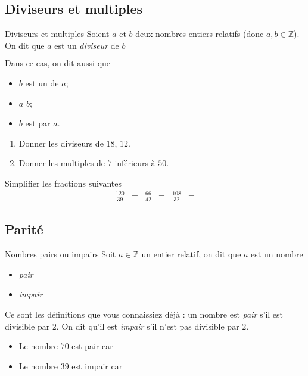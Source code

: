 \documentclass[11pt]{article}
\begin{document}
\subsection{Diviseurs et multiples}
\begin{defi}{Diviseurs et multiples}
  Soient $a$ et $b$ deux nombres entiers relatifs (donc $a,b\in\mathbb{Z}$). On
  dit que $a$ est un \emph{diviseur} de $b$ 
  \[
    \phantom{b = k\times a.}
  \]
  Dans ce cas, on dit aussi que
  \begin{itemize}
    \item $b$ est un \hspace{2cm} de $a$;
    \item $a$ \hspace{2cm} $b$;
    \item $b$ est \hspace{2cm} par $a$.
  \end{itemize}
\end{defi}
\begin{exemple}
  \begin{enumerate}
    \item Donner les diviseurs de $18$, $12$.
    \item Donner les multiples de $7$ inférieurs à $50$.
  \end{enumerate}
\end{exemple}
\begin{exemple}
  Simplifier les fractions suivantes
  \begin{align*}
    \frac{120}{39} &= &
    \frac{66}{42} &= &
    \frac{108}{32} &=
  \end{align*}
\end{exemple}
\subsection{Parité}
\begin{defi}{Nombres pairs ou impairs}
  Soit $a\in\mathbb{Z}$ un entier relatif, on dit que $a$ est un nombre
  \begin{itemize}
    \item \emph{pair} 
    \item \emph{impair} 
  \end{itemize}
\end{defi}
\begin{rmq}
  Ce sont les définitions que vous connaissiez déjà : un nombre est
  \emph{pair} s'il est divisible par $2$. On dit qu'il est \emph{impair} s'il
  n'est pas divisible par $2$.
\end{rmq}
\begin{exemple}
  \begin{itemize}
    \item Le nombre $70$ est pair car
    \item Le nombre $39$ est impair car
  \end{itemize}
\end{exemple}
\end{document}
